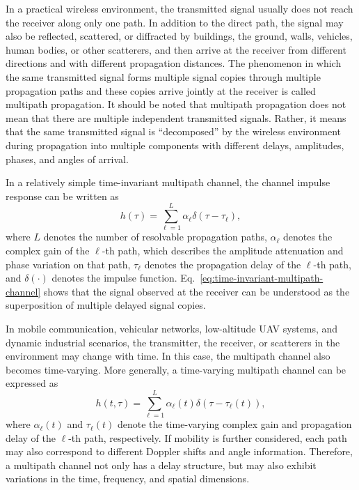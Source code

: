In a practical wireless environment,
the transmitted signal usually does not reach the receiver along only one path.
In addition to the direct path,
the signal may also be reflected,
scattered,
or diffracted by buildings,
the ground,
walls,
vehicles,
human bodies,
or other scatterers,
and then arrive at the receiver from different directions and with different propagation distances.
The phenomenon in which the same transmitted signal forms multiple signal copies through multiple propagation paths
and these copies arrive jointly at the receiver is called multipath propagation.
It should be noted that multipath propagation does not mean that there are multiple independent transmitted signals.
Rather,
it means that the same transmitted signal is ``decomposed'' by the wireless environment during propagation
into multiple components with different delays,
amplitudes,
phases,
and angles of arrival.

In a relatively simple time-invariant multipath channel,
the channel impulse response can be written as
\begin{equation}
    h(\tau)
    =
    \sum_{\ell=1}^{L}
    \alpha_{\ell}
    \delta
    \left(
        \tau-\tau_{\ell}
    \right),
    \label{eq:time-invariant-multipath-channel}
\end{equation}
where
\(L\) denotes the number of resolvable propagation paths,
\(\alpha_{\ell}\) denotes the complex gain of the \(\ell\)-th path,
which describes the amplitude attenuation and phase variation on that path,
\(\tau_{\ell}\) denotes the propagation delay of the \(\ell\)-th path,
and \(\delta(\cdot)\) denotes the impulse function.
Eq.~\eqref{eq:time-invariant-multipath-channel} shows that the signal observed at the receiver
can be understood as the superposition of multiple delayed signal copies.

In mobile communication,
vehicular networks,
low-altitude UAV systems,
and dynamic industrial scenarios,
the transmitter,
the receiver,
or scatterers in the environment may change with time.
In this case,
the multipath channel also becomes time-varying.
More generally,
a time-varying multipath channel can be expressed as
\begin{equation}
    h(t,\tau)
    =
    \sum_{\ell=1}^{L}
    \alpha_{\ell}(t)
    \delta
    \left(
        \tau-\tau_{\ell}(t)
    \right),
    \label{eq:time-varying-multipath-channel}
\end{equation}
where
\(\alpha_{\ell}(t)\) and \(\tau_{\ell}(t)\)
denote the time-varying complex gain and propagation delay of the \(\ell\)-th path,
respectively.
If mobility is further considered,
each path may also correspond to different Doppler shifts and angle information.
Therefore,
a multipath channel not only has a delay structure,
but may also exhibit variations in the time,
frequency,
and spatial dimensions.

